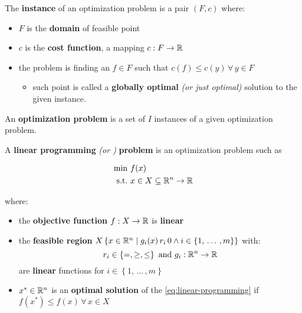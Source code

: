 \documentclass[english]{article}
\begin{document}
\bigskip
\begin{definition}
  \label{def:instance-lp}
  The \textbf{instance} of an optimization problem is a pair \(\left( F, c \right)\) where:
  \begin{itemize}
    \item \(F\) is the \textbf{domain} of feasible point
    \item \(c\) is the \textbf{cost function}, a mapping \(c :  F \rightarrow \mathbb{R}\)
    \item the problem is finding an \(f \in F\) such that \(c\left( f \right) \leq c\left( y \right) \, \forall \, y \in F\)
          \begin{itemize}
            \item such point is called a \textbf{globally optimal} \textit{(or just optimal)} solution to the given instance.
          \end{itemize}
  \end{itemize}

  An \textbf{optimization problem} is a set of \(I\) instances of a given optimization problem.
\end{definition}

\begin{definition}
  \label{def:linear-programming-problem}
  A \textbf{linear programming} \textit{(or \LP)} \textbf{problem} is an optimization problem such as

  \begin{gather*}
    \begin{aligned}
      \min \         & f(x)                                  \\
      \text{s.t.} \  & x \in X \subseteq \mathbb{R}^n \rightarrow \mathbb{R}
    \end{aligned}
    \label{eq:linear-programming}
  \end{gather*}

  where:

  \begin{itemize}
    \item the \textbf{objective function} \(f: X \rightarrow \mathbb{R}\) is \textbf{linear}
    \item the \textbf{feasible region} \(X \left\{ x \in \mathbb{R}^n \mid   g_i(x) \, r_i \, 0 \land i \in \left\{ 1, \, \ldots \,, m \right\}\right\}\) with: \[r_i \in \left\{ =, \geq, \leq \right\} \ \text{and} \ g_i: \R^n \rightarrow \R\] are \textbf{linear} functions for \(i \in \left\{ 1, \, \ldots \,, m \right\}\)

    \item \(x^\ast \in \mathbb{R}^n\) is an \textbf{optimal solution} of the \LP \ref{eq:linear-programming} if \(f(x^\ast) \leq f(x) \, \forall \, x \in X\)
  \end{itemize}
\end{definition}
\end{document}
